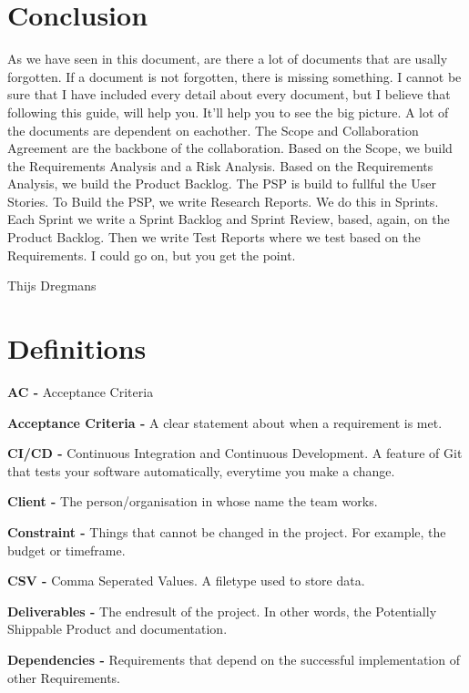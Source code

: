 \documentclass[10pt]{report}
\begin{document}
\chapter{Conclusion}
\thispagestyle{fancy}

As we have seen in this document, are there a lot of documents that are usally forgotten. If a document is not forgotten, there is missing something. I cannot be sure that I have included every detail about every document, but I believe that following this guide, will help you. It'll help you to see the big picture. A lot of the documents are dependent on eachother. The Scope and Collaboration Agreement are the backbone of the collaboration. Based on the Scope, we build the Requirements Analysis and a Risk Analysis. Based on the Requirements Analysis, we build the Product Backlog. The PSP is build to fullful the User Stories. To Build the PSP, we write Research Reports. We do this in Sprints. Each Sprint we write a Sprint Backlog and Sprint Review, based, again, on the Product Backlog. Then we write Test Reports where we test based on the Requirements. I could go on, but you get the point.

\bigskip

Thijs Dregmans


\chapter{Definitions}
\thispagestyle{fancy}

\textbf{AC -} Acceptance Criteria

\textbf{Acceptance Criteria -} A clear statement about when a requirement is met. 

\textbf{CI/CD -} Continuous Integration and Continuous Development. A feature of Git that tests your software automatically, everytime you make a change.

\textbf{Client -} The person/organisation in whose name the team works.

\textbf{Constraint -} Things that cannot be changed in the project. For example, the budget or timeframe.

\textbf{CSV -} Comma Seperated Values. A filetype used to store data.

\textbf{Deliverables -} The endresult of the project. In other words, the Potentially Shippable Product and documentation.

\textbf{Dependencies -} Requirements that depend on the successful implementation of other Requirements.
\end{document}
